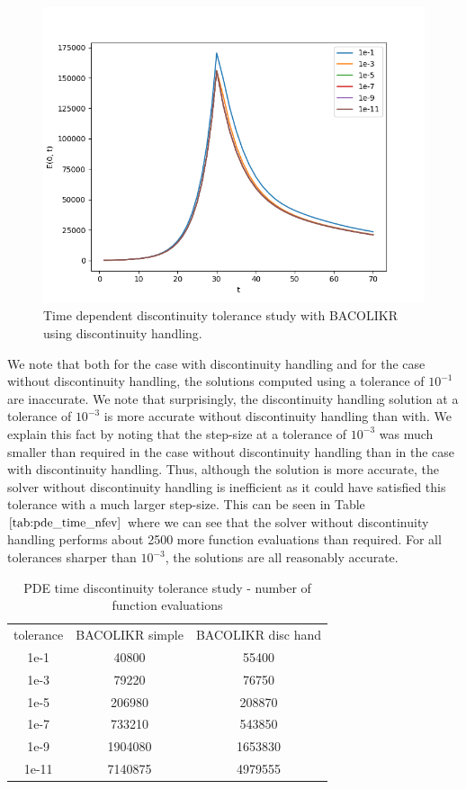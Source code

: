 \begin{figure}[H]
\centering
\includegraphics[width=0.7\linewidth]{./figures/pde_time_disc_bacolikr_disc_hand_tol}
\caption{Time dependent discontinuity tolerance study with BACOLIKR using discontinuity handling.}
\label{fig:pde_time_disc_bacolikr_disc_hand_tol}
\end{figure}

We note that both for the case with discontinuity handling and for the case without discontinuity handling, the solutions computed using a tolerance of $10^{-1}$ are inaccurate. We note that surprisingly, the discontinuity handling solution at a tolerance of $10^{-3}$ is more accurate without discontinuity handling than with. We explain this fact by noting that the step-size at a tolerance of $10^{-3}$ was much smaller than required in the case without discontinuity handling than in the case with discontinuity handling. Thus, although the solution is more accurate, the solver without discontinuity handling is inefficient as it could have satisfied this tolerance with a much larger step-size. This can be seen in Table $\ref{tab:pde_time_nfev}$ where we can see that the solver without discontinuity handling performs about 2500 more function evaluations than required. For all tolerances sharper than $10^{-3}$, the solutions are all reasonably accurate.

\begin{table}[h]
\caption {PDE time discontinuity tolerance study - number of function evaluations} 
\label{tab:pde_time_nfev}
\begin{center}
\begin{tabular}{ c c c } 
tolerance & BACOLIKR simple  & BACOLIKR disc hand \\ 
1e-1      &   40800         &   55400 \\
1e-3      &   79220         &   76750 \\
1e-5      &  206980         &  208870 \\
1e-7      &  733210         &  543850 \\
1e-9      & 1904080         & 1653830 \\
1e-11     & 7140875         & 4979555 \\
\end{tabular}
\end{center}
\end{table}

